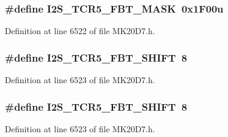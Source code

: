 \subsubsection[{\texorpdfstring{I2\+S\+\_\+\+T\+C\+R5\+\_\+\+F\+B\+T\+\_\+\+M\+A\+SK}{I2S_TCR5_FBT_MASK}}]{\setlength{\rightskip}{0pt plus 5cm}\#define I2\+S\+\_\+\+T\+C\+R5\+\_\+\+F\+B\+T\+\_\+\+M\+A\+SK~0x1\+F00u}\hypertarget{group___i2_s___register___masks_ga95e32e5df1218cb76b09a99f46d9eca2}{}\label{group___i2_s___register___masks_ga95e32e5df1218cb76b09a99f46d9eca2}


Definition at line 6522 of file M\+K20\+D7.\+h.

\subsubsection[{\texorpdfstring{I2\+S\+\_\+\+T\+C\+R5\+\_\+\+F\+B\+T\+\_\+\+S\+H\+I\+FT}{I2S_TCR5_FBT_SHIFT}}]{\setlength{\rightskip}{0pt plus 5cm}\#define I2\+S\+\_\+\+T\+C\+R5\+\_\+\+F\+B\+T\+\_\+\+S\+H\+I\+FT~8}\hypertarget{group___i2_s___register___masks_gaaeadb079b059ec5d832aa9bce021f0ab}{}\label{group___i2_s___register___masks_gaaeadb079b059ec5d832aa9bce021f0ab}


Definition at line 6523 of file M\+K20\+D7.\+h.

\subsubsection[{\texorpdfstring{I2\+S\+\_\+\+T\+C\+R5\+\_\+\+F\+B\+T\+\_\+\+S\+H\+I\+FT}{I2S_TCR5_FBT_SHIFT}}]{\setlength{\rightskip}{0pt plus 5cm}\#define I2\+S\+\_\+\+T\+C\+R5\+\_\+\+F\+B\+T\+\_\+\+S\+H\+I\+FT~8}\hypertarget{group___i2_s___register___masks_gaaeadb079b059ec5d832aa9bce021f0ab}{}\label{group___i2_s___register___masks_gaaeadb079b059ec5d832aa9bce021f0ab}


Definition at line 6523 of file M\+K20\+D7.\+h.

